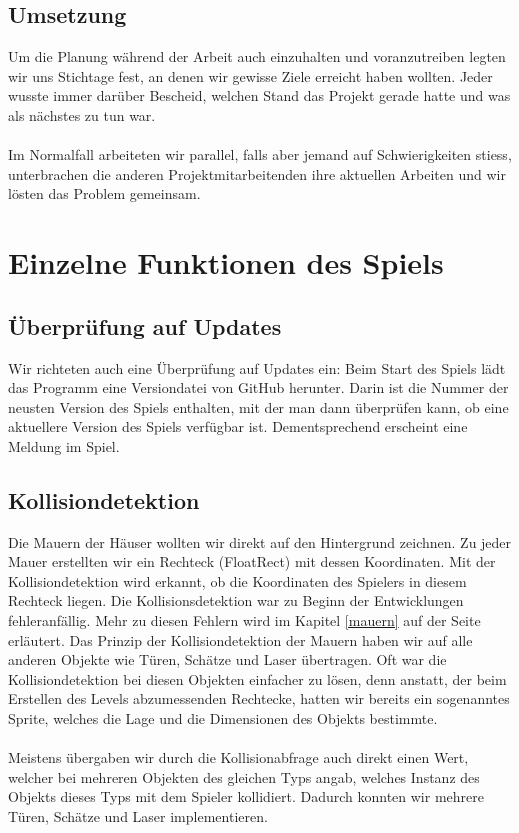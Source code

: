 \documentclass[11pt,a4paper]{scrbook}
\begin{document}
\subsection{Umsetzung}
Um die Planung während der Arbeit auch einzuhalten und voranzutreiben legten wir uns Stichtage fest, an denen wir gewisse Ziele erreicht haben wollten. Jeder wusste immer darüber Bescheid, welchen Stand das Projekt gerade hatte und was als nächstes zu tun war.\\
\\
Im Normalfall arbeiteten wir parallel, falls aber jemand auf Schwierigkeiten stiess, unterbrachen die anderen Projektmitarbeitenden ihre aktuellen Arbeiten und wir lösten das Problem gemeinsam.  
\newpage
\section{Einzelne Funktionen des Spiels}

\subsection{Überprüfung auf Updates}
Wir richteten auch eine Überprüfung auf Updates ein: Beim Start des Spiels lädt das Programm eine Versiondatei von GitHub herunter. Darin ist die Nummer der neusten Version des Spiels enthalten, mit der man dann überprüfen kann, ob eine aktuellere Version des Spiels verfügbar ist. Dementsprechend erscheint eine Meldung im Spiel.

\subsection{Kollisiondetektion}
Die Mauern der Häuser wollten wir direkt auf den Hintergrund zeichnen. Zu jeder Mauer erstellten wir ein Rechteck (FloatRect) mit dessen Koordinaten. Mit der Kollisiondetektion wird erkannt, ob die Koordinaten des Spielers in diesem Rechteck liegen.
Die Kollisionsdetektion war zu Beginn der Entwicklungen fehleranfällig.
Mehr zu diesen Fehlern wird im Kapitel \ref{mauern} auf der Seite \pageref{mauern} erläutert.
Das Prinzip der Kollisiondetektion der Mauern haben wir auf alle anderen Objekte wie Türen, Schätze und Laser übertragen.
Oft war die Kollisiondetektion bei diesen Objekten einfacher zu lösen, denn anstatt, der beim Erstellen des Levels abzumessenden Rechtecke, hatten wir bereits ein sogenanntes Sprite, welches die Lage und die Dimensionen des Objekts bestimmte.\\
\\
Meistens übergaben wir durch die Kollisionabfrage auch direkt einen Wert, welcher bei mehreren Objekten des gleichen Typs angab, welches Instanz des Objekts dieses Typs mit dem Spieler kollidiert.
Dadurch konnten wir mehrere Türen, Schätze und Laser implementieren.
\end{document}
